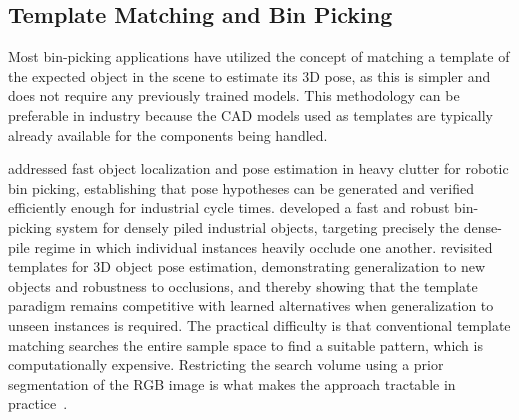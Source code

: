 \begin{table}[htbp]
\centering
\caption{Object detection and 6D pose estimation approaches for low-textured components.}
\label{tab:lit_pose}
\end{table}

\subsection{Template Matching and Bin Picking}\label{subsec:lit_template}

Most bin-picking applications have utilized the concept of matching a template of the expected
object in the scene to estimate its 3D pose, as this is simpler and does not require any previously
trained models. This methodology can be preferable in industry because the CAD models used as
templates are typically already available for the components being
handled.

\citet{liu2012fast} addressed fast object localization and pose estimation in heavy clutter for
robotic bin picking, establishing that pose hypotheses can be generated and verified efficiently
enough for industrial cycle times. \citet{guo2020fast} developed a fast and robust bin-picking
system for densely piled industrial objects, targeting precisely the dense-pile regime in which
individual instances heavily occlude one another. \citet{nguyen2022templates} revisited templates
for 3D object pose estimation, demonstrating generalization to new objects and robustness to
occlusions, and thereby showing that the template paradigm remains competitive with learned
alternatives when generalization to unseen instances is required. The practical difficulty is that conventional template matching searches the entire sample space to find a suitable pattern, which is
computationally expensive. Restricting the search volume using a prior segmentation of the RGB image
is what makes the approach tractable in practice~\citep{sk2024bolthandling}.

